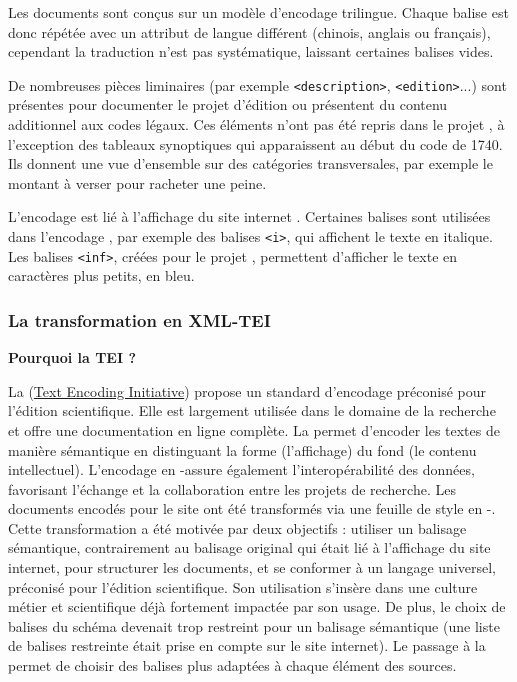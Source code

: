 Les documents sont conçus sur un modèle d’encodage trilingue. Chaque balise est donc répétée avec un attribut de langue différent (chinois, anglais ou français), cependant la traduction n’est pas systématique, laissant certaines balises vides. 

De nombreuses pièces liminaires (par exemple \texttt{<description>}, \texttt{<edition>}...) sont présentes pour documenter le projet d’édition \LSC ou présentent du contenu additionnel aux codes légaux. Ces éléments n’ont pas été repris dans le projet \COREL, à l’exception des tableaux synoptiques qui apparaissent au début du code de 1740. Ils donnent une vue d’ensemble sur des catégories transversales, par exemple le montant à verser pour racheter une peine. 

L’encodage \XML est lié à l’affichage du site internet \LSC. Certaines balises \HTML sont utilisées dans l’encodage \XML, par exemple des balises \texttt{<i>}, qui affichent le texte en italique. Les balises \texttt{<inf>}, créées pour le projet \LSC, permettent d’afficher le texte en caractères plus petits, en bleu. 

\subsubsection{La transformation en XML-TEI}
\textbf{Pourquoi la TEI ? }

La \TEI (\href{https://tei-c.org/}{Text Encoding Initiative}) propose un standard d'encodage préconisé pour l'édition scientifique. Elle est largement utilisée dans le domaine de la recherche et offre une documentation en ligne complète. La \TEI permet d'encoder les textes de manière sémantique en distinguant la forme (l'affichage) du fond (le contenu intellectuel). L'encodage en \XML-\TEI assure également l'interopérabilité des données, favorisant l'échange et la collaboration entre les projets de recherche.
Les documents \XML encodés pour le site \LSC ont été transformés via une feuille de style \XSL en \XML-\TEI. Cette transformation a été motivée par deux objectifs : utiliser un balisage sémantique, contrairement au balisage \XML original qui était lié à l’affichage du site internet, pour structurer les documents, et se conformer à un langage universel, préconisé pour l’édition scientifique. Son utilisation s’insère dans une culture métier et scientifique déjà fortement impactée par son usage. De plus, le choix de balises du schéma \LSC devenait trop restreint pour un balisage sémantique (une liste de balises restreinte était prise en compte sur le site internet). Le passage à la \TEI permet de choisir des balises plus adaptées à chaque élément des sources.

